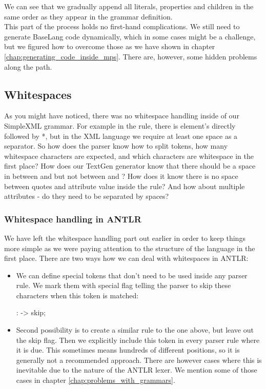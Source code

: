 We can see that we gradually append all literals, properties and children in the same order as they appear in the grammar definition. 
\\

This part of the process holds no first-hand complications. We still need to generate BaseLang code dynamically, which in some cases might be a challenge, but we figured how to overcome those as we have shown in chapter \ref{chap:generating_code_inside_mps}. There are, however, some hidden problems along the path.

\subsection{Whitespaces}
As you might have noticed, there was no whitespace handling inside of our SimpleXML grammar. For example in the  rule, there is element's  directly followed by *, but in the XML language we require at least one space as a separator. So how does the parser know how to split tokens, how many whitespace characters are expected, and which characters are whitespace in the first place? How does our TextGen generator know that there should be a space in between  and  but not between \literal{<} and ? How does it know there is no space between quotes and attribute value inside the  rule? And how about multiple attributes - do they need to be separated by spaces?

\subsubsection{Whitespace handling in ANTLR}

We have left the whitespace handling part out earlier in order to keep things more simple as we were paying attention to the structure of the language in the first place. There are two ways how we can deal with whitespaces in ANTLR:

\begin{itemize}
	\item We can define special tokens that don't need to be used inside any parser rule. We mark them with special flag telling the parser to skip these characters when this token is matched: 

	\begin{antlr}
		   :     -> skip;
	\end{antlr}

	\item Second possibility is to create a similar rule to the one above, but leave out the skip flag. Then we explicitly include this token in every parser rule where it is due. This sometimes means hundreds of different positions, so it is generally not a recommended approach. There are however cases where this is inevitable due to the nature of the ANTLR lexer. We mention some of those cases in chapter \ref{chap:problems_with_grammars}.
\end{itemize}

